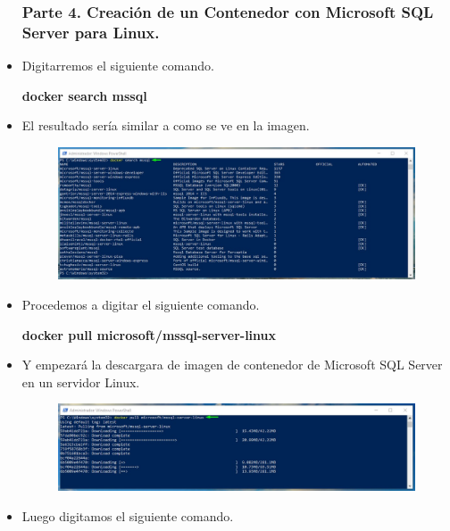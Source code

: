 \begin{itemize}
			\subsubsection{Parte 4. Creación de un Contenedor con Microsoft SQL Server para Linux.}
				\item Digitarremos el siguiente comando.
					\begin{center}
						\textbf{docker search mssql}
					\end{center}
				\item El resultado sería similar a como se ve en la imagen.
					\begin{figure}[htb]
						\begin{center}
							\includegraphics[width=16cm]{./Imagenes/Comando02}
						\end{center}
					\end{figure}
				\item{Procedemos a digitar el siguiente comando.}
					\begin{center}
						\textbf{docker pull microsoft/mssql-server-linux} \\
					\end{center}
				\item Y empezará la descargara de imagen de contenedor de Microsoft SQL Server en un servidor Linux.
					\begin{figure}[htb]
						\begin{center}
							\includegraphics[width=16cm]{./Imagenes/Comando03}
						\end{center}
					\end{figure}
				\item Luego digitamos el siguiente comando.

\end{itemize}

